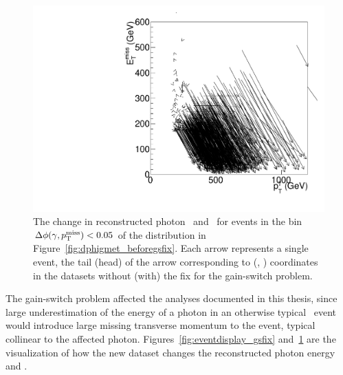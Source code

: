 \begin{figure}[htbp]
  \centering
  \includegraphics[width=0.6\linewidth]{Reconstruction/Figures/gsfix/movements.pdf}
  \caption{
    The change in reconstructed photon \pt\ and \met\ for events in the bin $\Delta \phi(\gamma, p_{\mathrm{T}}^\text{miss}) < 0.05$ of the distribution in Figure~\ref{fig:dphigmet_beforegsfix}. 
    Each arrow represents a single event, the tail (head) of the arrow corresponding to (\ETg, \met) coordinates in the datasets without (with) the fix for the gain-switch problem.
  }
  \label{fig:ptshift_gsfix}
\end{figure}

The gain-switch problem affected the analyses documented in this thesis, since large underestimation of the energy of a photon in an otherwise typical \gj\ event would introduce large missing transverse momentum to the event, typical collinear to the affected photon. 
Figures~\ref{fig:eventdisplay_gsfix} and~\ref{fig:ptshift_gsfix} are the visualization of how the new dataset changes the reconstructed photon energy and \met.
